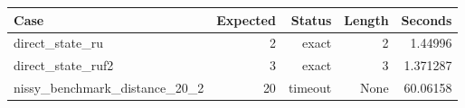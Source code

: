 {\small
\begin{tabular}{lrrrr}
\hline
Case & Expected & Status & Length & Seconds \\
\hline
direct\_state\_ru & 2 & exact & 2 & 1.44996 \\
direct\_state\_ruf2 & 3 & exact & 3 & 1.371287 \\
nissy\_benchmark\_distance\_20\_2 & 20 & timeout & None & 60.06158 \\
\hline
\end{tabular}
}
